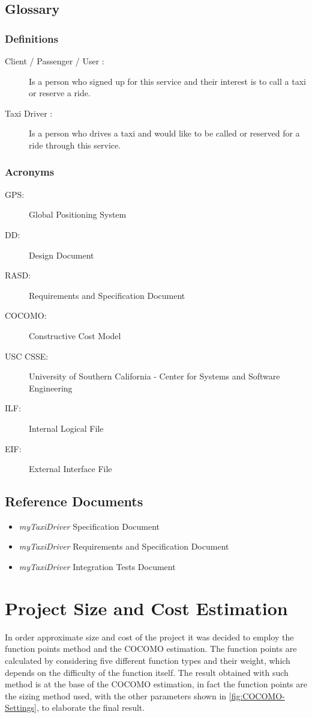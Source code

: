 \documentclass[a4paper]{article}
\begin{document}
\subsection{Glossary}

\subsubsection{Definitions}

\begin{description}
\item[Client / Passenger / User :] Is a person who signed up for this service and their interest is to call a taxi or reserve  a ride.
\item[Taxi Driver :] Is a person who drives a taxi and would like to be called or reserved for a ride through this service.
\end{description}

\subsubsection{Acronyms}

\begin{description}
\item[GPS:] Global Positioning System
\item[DD:] Design Document
\item[RASD: ] Requirements and Specification Document
\item[COCOMO: ] Constructive Cost Model
\item[USC CSSE:] University of Southern California - Center for Systems and Software
Engineering
\item[ILF:] Internal Logical File
\item[EIF:] External Interface File
\end{description}

\subsection{Reference Documents}
\begin{itemize}
\item \emph{myTaxiDriver} Specification Document
\item \emph{myTaxiDriver} Requirements and Specification Document
\item \emph{myTaxiDriver} Integration Tests Document
\end{itemize}

\section{Project Size and Cost Estimation}
In order approximate size and cost of the project it was decided to employ the function points method and the COCOMO estimation. The function points are calculated by considering five different function types and their weight, which depends on the difficulty of the function itself. The result obtained with such method is at the base of the COCOMO estimation, in fact the function points are the sizing method used, with the other parameters shown in \autoref{fig:COCOMO-Settings}, to elaborate the final result.
\end{document}

